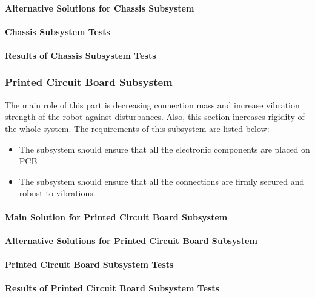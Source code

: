 \documentclass[a4paper,12pt]{article}
\begin{document}
	\paragraph{Alternative Solutions for Chassis Subsystem}
	
	\paragraph{Chassis Subsystem Tests}
	
	\paragraph{Results of Chassis Subsystem Tests}
	
	
	\subsubsection{Printed Circuit Board Subsystem}
	The main role of this part is decreasing connection mass and increase vibration strength of the robot against disturbances. Also, this section increases rigidity of the whole system. The requirements of this subsystem are listed below:
	\begin{itemize}
		\item The subsystem should ensure that all the electronic components are placed on PCB
		\item The subsystem should ensure that all the connections are firmly secured and robust to vibrations.
	\end{itemize}
	
	\paragraph{Main Solution for Printed Circuit Board Subsystem}
	
	\paragraph{Alternative Solutions for Printed Circuit Board Subsystem}
	
	\paragraph{Printed Circuit Board Subsystem Tests}
	
	\paragraph{Results of Printed Circuit Board Subsystem Tests}
	
\end{document}
